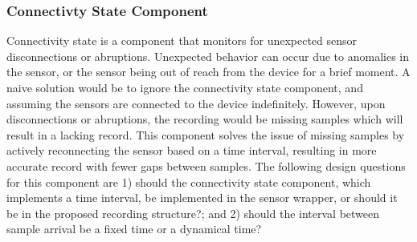 \subsubsection{Connectivty State Component} \label{sssec:csc}
Connectivity state is a component that monitors for unexpected sensor disconnections or abruptions. Unexpected behavior can occur due to anomalies in the sensor, or the sensor being out of reach from the device for a brief moment.  A naive solution would be to ignore the connectivity state component, and assuming the sensors are connected to the device indefinitely. However, upon disconnections or abruptions, the recording would be missing samples which will result in a lacking record. This component solves the issue of missing samples by actively reconnecting the sensor based on a time interval, resulting in more accurate record with fewer gaps between samples. The following design questions for this component are 1) should the connectivity state component, which implements a time interval, be implemented in the sensor wrapper, or should it be in the proposed recording structure?; and 2) should the interval between sample arrival be a fixed time or a dynamical time? 


